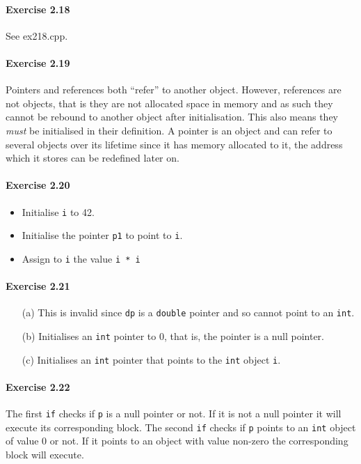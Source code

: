 \paragraph{Exercise 2.18}
See ex218.cpp.

\paragraph{Exercise 2.19}
Pointers and references both ``refer'' to another object. However, references are not objects, that is they are not allocated space in memory and as such they cannot be rebound to another object after initialisation. This also means they \textit{must} be initialised in their definition. A pointer is an object and can refer to several objects over its lifetime since it has memory allocated to it, the address which it stores can be redefined later on.

\paragraph{Exercise 2.20}
\begin{itemize}
	\item Initialise \texttt{i} to 42.
	\item Initialise the pointer \texttt{p1} to point to \texttt{i}.
	\item Assign to \texttt{i} the value \texttt{i * i}
\end{itemize}

\paragraph{Exercise 2.21}
\begin{itemize}
	\item [(a)]
		This is invalid since \texttt{dp} is a \texttt{double} pointer and so cannot point to an \texttt{int}.
	\item [(b)]
		Initialises an \texttt{int} pointer to 0, that is, the pointer is a null pointer.
	\item [(c)]
		Initialises an \texttt{int} pointer that points to the \texttt{int} object \texttt{i}.
\end{itemize}

\paragraph{Exercise 2.22}
The first \texttt{if} checks if \texttt{p} is a null pointer or not. If it is not a null pointer it will execute its corresponding block. The second \texttt{if} checks if \texttt{p} points to an \texttt{int} object of value 0 or not. If it points to an object with value non-zero the corresponding block will execute.

